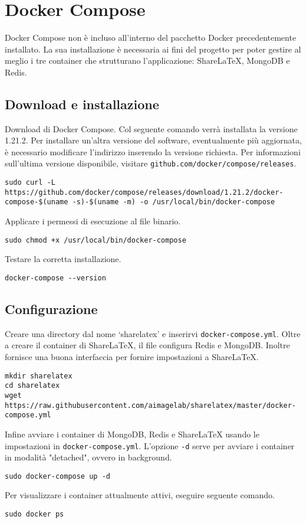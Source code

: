\section{Docker Compose}
Docker Compose non è incluso all'interno del pacchetto Docker precedentemente installato. La sua installazione è necessaria ai fini del progetto per poter gestire al meglio i tre container che strutturano l'applicazione: ShareLaTeX, MongoDB e Redis.

\subsection{Download e installazione}
Download di Docker Compose. Col seguente comando verrà installata la versione 1.21.2. Per installare un'altra versione del software, eventualmente più aggiornata, è necessario modificare l'indirizzo inserendo la versione richiesta. Per informazioni sull'ultima versione disponibile, visitare \verb|github.com/docker/compose/releases|.
\begin{lstlisting}
sudo curl -L https://github.com/docker/compose/releases/download/1.21.2/docker-compose-$(uname -s)-$(uname -m) -o /usr/local/bin/docker-compose
\end{lstlisting}
Applicare i permessi di esecuzione al file binario.
\begin{lstlisting}
sudo chmod +x /usr/local/bin/docker-compose
\end{lstlisting}
Testare la corretta installazione.
\begin{lstlisting}
docker-compose --version
\end{lstlisting}

\subsection{Configurazione}
Creare una directory dal nome \enquote*{sharelatex} e inserirvi \verb|docker-compose.yml|. Oltre a creare il container di ShareLaTeX, il file configura Redis e MongoDB. Inoltre fornisce una buona interfaccia per fornire impostazioni a ShareLaTeX.
\begin{lstlisting}
mkdir sharelatex
cd sharelatex
wget https://raw.githubusercontent.com/aimagelab/sharelatex/master/docker-compose.yml
\end{lstlisting}
Infine avviare i container di MongoDB, Redis e ShareLaTeX usando le impostazioni in \verb|docker-compose.yml|. L'opzione \verb|-d| serve per avviare i container in modalità "detached", ovvero in background.
\begin{lstlisting}
sudo docker-compose up -d
\end{lstlisting}
Per visualizzare i container attualmente attivi, eseguire seguente comando.
\begin{lstlisting}
sudo docker ps
\end{lstlisting}